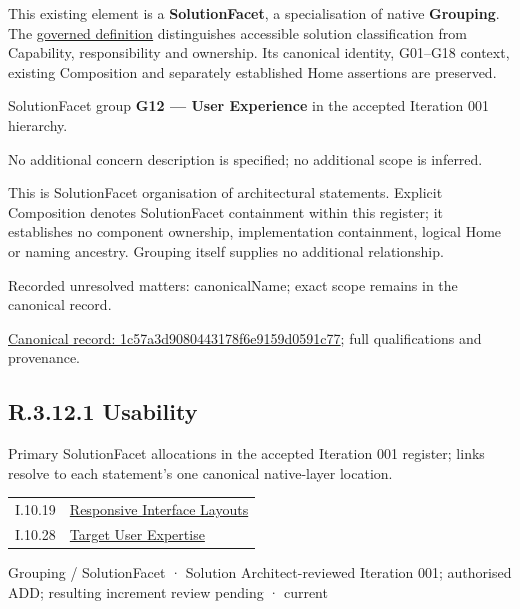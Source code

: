 This existing element is a \textbf{SolutionFacet}, a specialisation of native
\textbf{Grouping}. The \href{\detokenize{../../../../../../../governance/continuum-representation.md#solutionfacet-classification--1119-candidate}}{governed definition}
distinguishes accessible solution classification from Capability, responsibility
and ownership. Its canonical identity, G01–G18 context, existing Composition
and separately established Home assertions are preserved.



SolutionFacet group \textbf{G12 — User Experience} in the accepted Iteration 001 hierarchy.



No additional concern description is specified; no additional scope is inferred.



This is SolutionFacet organisation of architectural statements. Explicit Composition denotes SolutionFacet containment within this register; it establishes no component ownership, implementation containment, logical Home or naming ancestry. Grouping itself supplies no additional relationship.


{\small Recorded unresolved matters: canonicalName; exact scope remains in the canonical record.}\par
{\footnotesize \href{../../../../../../../continuum/grouping/1c57a3d9080443178f6e9159d0591c77.md}{Canonical record: 1c57a3d9080443178f6e9159d0591c77}; full qualifications and provenance.}\par
\subsection*{R.3.12.1 Usability}
\label{navigation:R.3.12.1}

Primary SolutionFacet allocations in the accepted Iteration 001 register; links resolve to each statement’s one canonical native-layer location.\par
\begin{longtable}{p{.22\linewidth}p{.73\linewidth}}
I.10.19 & \hyperref[element:2e276eda09a94670bee0619468947895]{Responsive Interface Layouts} \\
I.10.28 & \hyperref[element:1c0b0e15434d47b1b08ad86e087a45d1]{Target User Expertise} \\
\end{longtable}
\label{element:58c3577b30fd4748836a1d52e07c8a98}
{\small Grouping / SolutionFacet · Solution Architect-reviewed Iteration 001; authorised ADD; resulting increment review pending · current}\par

